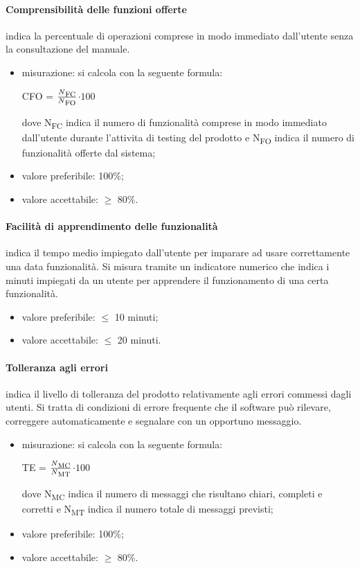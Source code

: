 \paragraph{Comprensibilità delle funzioni offerte}
indica la percentuale di operazioni comprese in modo immediato dall’utente senza la consultazione del manuale.
	\begin{itemize}
	    \item misurazione: si calcola con la seguente formula: \\
		\centerline{ CFO =  \(\frac{N\textsubscript{FC}}{N\textsubscript{FO}} \)$ \cdot 100$ }
		dove N\textsubscript{FC} indica il numero di funzionalità comprese in modo immediato dall’utente durante l'attivita di testing del 
        prodotto e N\textsubscript{FO} indica il numero di funzionalità offerte dal sistema;
		\item valore preferibile: 100\%;
		\item valore accettabile: $\geq$ 80\%.
	\end{itemize}

    \paragraph{Facilità di apprendimento delle funzionalità}
    indica il tempo medio impiegato dall’utente per imparare ad usare correttamente una data funzionalità. 
    Si misura tramite un indicatore numerico che indica i minuti impiegati da un utente per apprendere il funzionamento di una certa funzionalità.
	\begin{itemize}
		\item valore preferibile: $\leq$ 10 minuti;
		\item valore accettabile: $\leq$ 20 minuti.
	\end{itemize}

    \paragraph{Tolleranza agli errori}
    indica il livello di tolleranza del prodotto relativamente agli errori commessi dagli 
    utenti. Si tratta di condizioni di errore frequente che il software può rilevare, correggere automaticamente e segnalare con un opportuno messaggio.
	\begin{itemize}
	    \item misurazione: si calcola con la seguente formula: \\
		\centerline{ TE =  \(\frac{N\textsubscript{MC}}{N\textsubscript{MT}} \)$ \cdot 100$ }
		dove N\textsubscript{MC} indica il numero di messaggi che risultano chiari, completi e corretti 
        e N\textsubscript{MT} indica il numero totale di messaggi previsti;
		\item valore preferibile: 100\%;
		\item valore accettabile: $\geq$ 80\%.
	\end{itemize}

